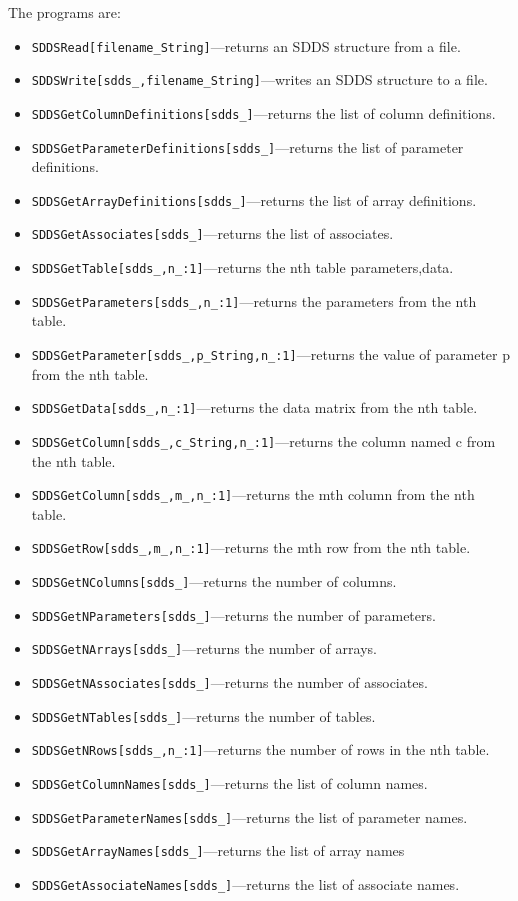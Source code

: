 \begin{itemize}
The programs are: 
\begin{itemize} 
\item \verb|SDDSRead[filename_String]|---returns an SDDS structure from a file. 
\item \verb|SDDSWrite[sdds_,filename_String]|---writes an SDDS structure to a file. 
\item \verb|SDDSGetColumnDefinitions[sdds_]|---returns the list of column definitions. 
\item \verb|SDDSGetParameterDefinitions[sdds_]|---returns the list of parameter definitions. 
\item \verb|SDDSGetArrayDefinitions[sdds_]|---returns the list of array definitions. 
\item \verb|SDDSGetAssociates[sdds_]|---returns the list of associates. 
\item \verb|SDDSGetTable[sdds_,n_:1]|---returns the nth table {parameters,data}. 
\item \verb|SDDSGetParameters[sdds_,n_:1]|---returns the parameters from the nth table. 
\item \verb|SDDSGetParameter[sdds_,p_String,n_:1]|---returns the value of parameter p from the nth table. 
\item \verb|SDDSGetData[sdds_,n_:1]|---returns the data matrix from the nth table. 
\item \verb|SDDSGetColumn[sdds_,c_String,n_:1]|---returns the column named c from the nth table. 
\item \verb|SDDSGetColumn[sdds_,m_,n_:1]|---returns the mth column from the nth table. 
\item \verb|SDDSGetRow[sdds_,m_,n_:1]|---returns the mth row from the nth table. 
\item \verb|SDDSGetNColumns[sdds_]|---returns the number of columns. 
\item \verb|SDDSGetNParameters[sdds_]|---returns the number of parameters. 
\item \verb|SDDSGetNArrays[sdds_]|---returns the number of arrays. 
\item \verb|SDDSGetNAssociates[sdds_]|---returns the number of associates. 
\item \verb|SDDSGetNTables[sdds_]|---returns the number of tables. 
\item \verb|SDDSGetNRows[sdds_,n_:1]|---returns the number of rows in the nth table. 
\item \verb|SDDSGetColumnNames[sdds_]|---returns the list of column names. 
\item \verb|SDDSGetParameterNames[sdds_]|---returns the list of parameter names. 
\item \verb|SDDSGetArrayNames[sdds_]|---returns the list of array names 
\item \verb|SDDSGetAssociateNames[sdds_]|---returns the list  
of associate names. 
\end{itemize} 
 

\end{itemize}
